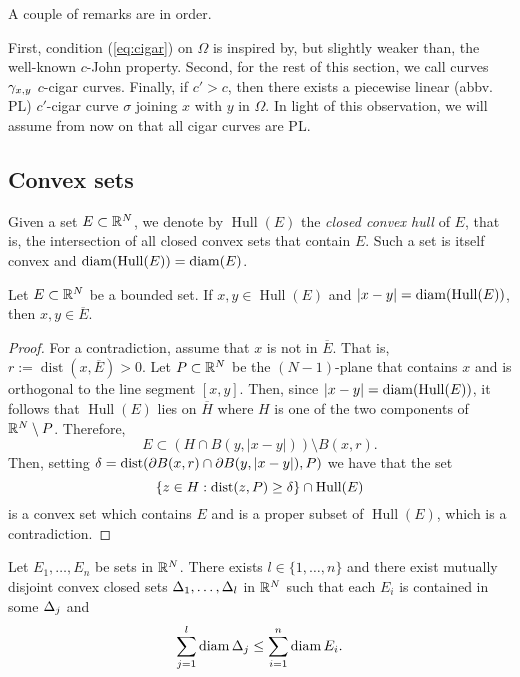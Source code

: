 \documentclass{amsart}
\DeclareMathOperator{\dist}{dist}
\DeclareMathOperator{\Hull}{Hull}
\begin{document}
A couple of remarks are in order.

\begin{remark}
First, condition (\ref{eq:cigar}) on $\Omega$ is inspired by, but slightly weaker than, the well-known $c$-John property. Second, for the rest of this section, we call curves $\gamma_{x,y}$ $c$-cigar curves. Finally, if $c'>c$, then there exists a piecewise linear (abbv. PL) $c'$-cigar curve $\sigma$ joining $x$ with $y$ in $\Omega$. In light of this observation, we will assume from now on that all cigar curves are PL.
\end{remark}

\subsection{Convex sets}

Given a set $E \subset \mathbb{R}^N$, we denote by $\Hull(E)$ the \emph{closed convex hull} of $E$, that is, the intersection of all closed convex sets that contain $E$. Such a set is itself convex and $\diam(\Hull(E)) = \diam(E)$. 

\begin{lemma}
Let $E\subset \mathbb{R}^N$ be a bounded set. If $x,y \in \Hull(E)$ and $|x-y| = \diam(\Hull(E))$, then $x,y \in \overline{E}$. 
\end{lemma}

\begin{proof}
For a contradiction, assume that $x$ is not in $\overline{E}$. That is, $r:=\dist(x,\overline{E})>0$. Let $P \subset \mathbb{R}^N$ be the $(N-1)$-plane that contains $x$ and is orthogonal to the line segment $[x,y]$. Then, since $|x-y| = \diam(\Hull(E))$, it follows that $\Hull(E)$ lies on $\overline{H}$ where $H$ is one of the two components of $\mathbb{R}^N \setminus P$. Therefore, 
\[ E \subset (H \cap B(y,|x-y|) )\setminus B(x,r).\]
Then, setting $\d = \dist( \partial B(x,r) \cap \partial B(y,|x-y|), P)$ we have that the set
\[ \{z\in H : \dist(z,P)\geq \d\}\cap \text{Hull}(E)\]
is a convex set which contains $E$ and is a proper subset of $\Hull(E)$, which is a contradiction.
\end{proof}

\begin{lemma}\label{lem:convexsub}
Let $E_1,\dots,E_n$ be sets in $\mathbb{R}^N$. There exists $l\in\{1,\dots,n\}$ and there exist mutually disjoint convex closed sets $\Delta_1,\dots,\Delta_l$ in $\mathbb{R}^N$ 
such that each $E_i$ is contained in some $\Delta_j$ and
\[\sum_{j=1}^l \operatorname{diam}{\Delta_j} \leq \sum_{i=1}^n\operatorname{diam}{E_i}.\]
\end{lemma}
\end{document}
